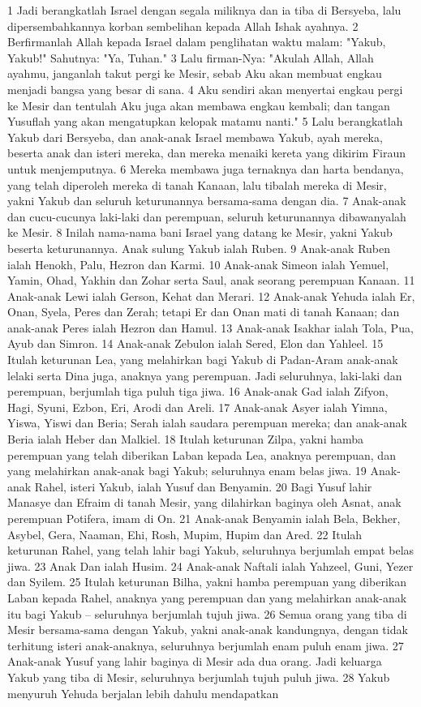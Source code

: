 \begin{biblechapter} %
1 Jadi berangkatlah Israel dengan segala miliknya dan ia tiba di Bersyeba, lalu dipersembahkannya korban sembelihan kepada Allah Ishak ayahnya. 2 Berfirmanlah Allah kepada Israel dalam penglihatan waktu malam: "Yakub, Yakub!" Sahutnya: "Ya, Tuhan." 3 Lalu firman-Nya: "Akulah Allah, Allah ayahmu, janganlah takut pergi ke Mesir, sebab Aku akan membuat engkau menjadi bangsa yang besar di sana. 4 Aku sendiri akan menyertai engkau pergi ke Mesir dan tentulah Aku juga akan membawa engkau kembali; dan tangan Yusuflah yang akan mengatupkan kelopak matamu nanti." 5 Lalu berangkatlah Yakub dari Bersyeba, dan anak-anak Israel membawa Yakub, ayah mereka, beserta anak dan isteri mereka, dan mereka menaiki kereta yang dikirim Firaun untuk menjemputnya. 6 Mereka membawa juga ternaknya dan harta bendanya, yang telah diperoleh mereka di tanah Kanaan, lalu tibalah mereka di Mesir, yakni Yakub dan seluruh keturunannya bersama-sama dengan dia. 7 Anak-anak dan cucu-cucunya laki-laki dan perempuan, seluruh keturunannya dibawanyalah ke Mesir. 8 Inilah nama-nama bani Israel yang datang ke Mesir, yakni Yakub beserta keturunannya. Anak sulung Yakub ialah Ruben. 9 Anak-anak Ruben ialah Henokh, Palu, Hezron dan Karmi. 10 Anak-anak Simeon ialah Yemuel, Yamin, Ohad, Yakhin dan Zohar serta Saul, anak seorang perempuan Kanaan. 11 Anak-anak Lewi ialah Gerson, Kehat dan Merari. 12 Anak-anak Yehuda ialah Er, Onan, Syela, Peres dan Zerah; tetapi Er dan Onan mati di tanah Kanaan; dan anak-anak Peres ialah Hezron dan Hamul. 13 Anak-anak Isakhar ialah Tola, Pua, Ayub dan Simron. 14 Anak-anak Zebulon ialah Sered, Elon dan Yahleel. 15 Itulah keturunan Lea, yang melahirkan bagi Yakub di Padan-Aram anak-anak lelaki serta Dina juga, anaknya yang perempuan. Jadi seluruhnya, laki-laki dan perempuan, berjumlah tiga puluh tiga jiwa. 16 Anak-anak Gad ialah Zifyon, Hagi, Syuni, Ezbon, Eri, Arodi dan Areli. 17 Anak-anak Asyer ialah Yimna, Yiswa, Yiswi dan Beria; Serah ialah saudara perempuan mereka; dan anak-anak Beria ialah Heber dan Malkiel. 18 Itulah keturunan Zilpa, yakni hamba perempuan yang telah diberikan Laban kepada Lea, anaknya perempuan, dan yang melahirkan anak-anak bagi Yakub; seluruhnya enam belas jiwa. 19 Anak-anak Rahel, isteri Yakub, ialah Yusuf dan Benyamin. 20 Bagi Yusuf lahir Manasye dan Efraim di tanah Mesir, yang dilahirkan baginya oleh Asnat, anak perempuan Potifera, imam di On. 21 Anak-anak Benyamin ialah Bela, Bekher, Asybel, Gera, Naaman, Ehi, Rosh, Mupim, Hupim dan Ared. 22 Itulah keturunan Rahel, yang telah lahir bagi Yakub, seluruhnya berjumlah empat belas jiwa. 23 Anak Dan ialah Husim. 24 Anak-anak Naftali ialah Yahzeel, Guni, Yezer dan Syilem. 25 Itulah keturunan Bilha, yakni hamba perempuan yang diberikan Laban kepada Rahel, anaknya yang perempuan dan yang melahirkan anak-anak itu bagi Yakub -- seluruhnya berjumlah tujuh jiwa. 26 Semua orang yang tiba di Mesir bersama-sama dengan Yakub, yakni anak-anak kandungnya, dengan tidak terhitung isteri anak-anaknya, seluruhnya berjumlah enam puluh enam jiwa. 27 Anak-anak Yusuf yang lahir baginya di Mesir ada dua orang. Jadi keluarga Yakub yang tiba di Mesir, seluruhnya berjumlah tujuh puluh jiwa. 28 Yakub menyuruh Yehuda berjalan lebih dahulu mendapatkan 
\end{biblechapter}

